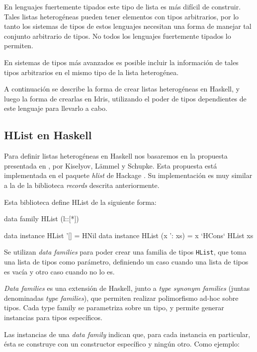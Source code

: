 En lenguajes fuertemente tipados este tipo de lista es más difícil de construir. Tales listas heterogéneas pueden tener elementos con tipos arbitrarios, por lo tanto los sistemas de tipos de estos lenguajes necesitan una forma de manejar tal conjunto arbitrario de tipos. No todos los lenguajes fuertemente tipados lo permiten.

En sistemas de tipos más avanzados es posible incluir la información de tales tipos arbitrarios en el mismo tipo de la lista heterogénea.

A continuación se describe la forma de crear listas heterogéneas en Haskell, y luego la forma de crearlas en Idris, utilizando el poder de tipos dependientes de este lenguaje para llevarlo a cabo.

\subsection{HList en Haskell}

Para definir listas heterogéneas en Haskell nos basaremos en la propuesta presentada en \cite{Kiselyov:2004:STH:1017472.1017488}, por Kiselyov, L\"{a}mmel y Schupke. Esta propuesta está implementada en el paquete \textit{hlist} de Hackage \cite{HListHackage}. Su implementación es muy similar a la de la biblioteca \textit{records} descrita anteriormente.

Esta biblioteca define HList de la siguiente forma:

\begin{code}
data family HList (l::[*])

data instance HList '[] = HNil
data instance HList (x ': xs) = x `HCons` HList xs
\end{code}

Se utilizan \textit{data families} para poder crear una familia de tipos \texttt{HList}, que toma una lista de tipos como parámetro, definiendo un caso cuando una lista de tipos es vacía y otro caso cuando no lo es.

\textit{Data families} es una extensión de Haskell, junto a \textit{type synonym families} (juntas denominadas \textit{type families}), que permiten realizar polimorfismo ad-hoc sobre tipos. Cada type family se parametriza sobre un tipo, y permite generar instancias para tipos específicos.

Las instancias de una \textit{data family} indican que, para cada instancia en particular, ésta se construye con un constructor específico y ningún otro. Como ejemplo:

